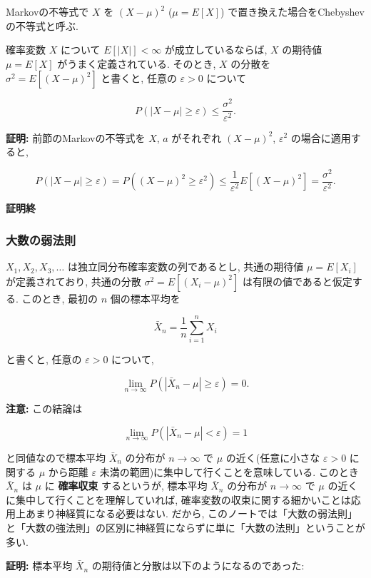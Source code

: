 \documentclass[
  letterpaper,
  DIV=11,
  numbers=noendperiod]{scrartcl}
\begin{document}
Markovの不等式で \(X\) を \((X-\mu)^2\) (\(\mu=E[X]\))
で置き換えた場合をChebyshevの不等式と呼ぶ.

確率変数 \(X\) について \(E[|X|]<\infty\) が成立しているならば, \(X\)
の期待値 \(\mu = E[X]\) がうまく定義されている. そのとき, \(X\) の分散を
\(\sigma^2 = E[(X-\mu)^2]\) と書くと, 任意の \(\varepsilon>0\) について

\[
P(|X-\mu|\ge \varepsilon) \le \frac{\sigma^2}{\varepsilon^2}.
\]

\textbf{証明:} 前節のMarkovの不等式を \(X\), \(a\) がそれぞれ
\((X-\mu)^2\), \(\varepsilon^2\) の場合に適用すると,

\[
P(|X-\mu|\ge \varepsilon) = P((X-\mu)^2 \ge \varepsilon^2) \le \frac{1}{\varepsilon^2}E[(X-\mu)^2] = \frac{\sigma^2}{\varepsilon^2}.
\]

\textbf{証明終}

\hypertarget{ux5927ux6570ux306eux5f31ux6cd5ux5247}{%
\subsubsection{大数の弱法則}\label{ux5927ux6570ux306eux5f31ux6cd5ux5247}}

\(X_1,X_2,X_3,\ldots\) は独立同分布確率変数の列であるとし, 共通の期待値
\(\mu=E[X_i]\) が定義されており, 共通の分散
\(\sigma^2 = E[(X_i-\mu)^2]\) は有限の値であると仮定する. このとき,
最初の \(n\) 個の標本平均を

\[
\bar{X}_n = \frac{1}{n}\sum_{i=1}^n X_i
\]

と書くと, 任意の \(\varepsilon> 0\) について,

\[
\lim_{n\to\infty} P(|\bar{X}_n - \mu|\ge\varepsilon) = 0.
\]

\textbf{注意:} この結論は

\[
\lim_{n\to\infty} P(|\bar{X}_n - \mu| < \varepsilon) = 1
\]

と同値なので標本平均 \(\bar{X}_n\) の分布が \(n\to\infty\) で \(\mu\)
の近く(任意に小さな \(\varepsilon>0\) に関する \(\mu\) から距離
\(\varepsilon\) 未満の範囲)に集中して行くことを意味している. このとき
\(\bar{X}_n\) は \(\mu\) に \textbf{確率収束} するというが, 標本平均
\(\bar{X}_n\) の分布が \(n\to\infty\) で \(\mu\)
の近くに集中して行くことを理解していれば,
確率変数の収束に関する細かいことは応用上あまり神経質になる必要はない.
だから,
このノートでは「大数の弱法則」と「大数の強法則」の区別に神経質にならずに単に「大数の法則」ということが多い.

\textbf{証明:} 標本平均 \(\bar{X}_n\)
の期待値と分散は以下のようになるのであった:
\end{document}

